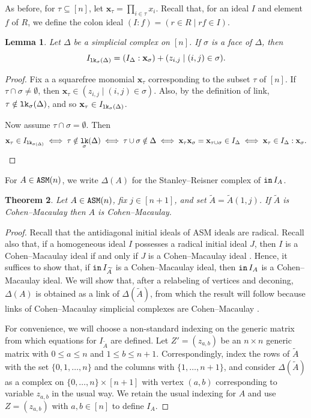 \documentclass[12 pt]{amsart}
\DeclareMathOperator{\init}{{\tt in}}
\DeclareMathOperator{\lk}{{\tt lk}}
\DeclareMathOperator{\asm}{\tt ASM}
\theoremstyle{plain}
\newtheorem{thm}{Theorem}[section]
\newtheorem{lemma}[thm]{Lemma}
\theoremstyle{definition}
\theoremstyle{remark}
\begin{document}
{As before, for $\tau \subseteq [n]$, let $\mathbf{x}_\tau = \prod_{i \in \tau} x_i$.  Recall that, for an ideal $I$ and element $f$ of $R$, we define the colon ideal $(I:f) = (r \in R \mid rf \in I)$.

\begin{lemma}\label{lem:link-colon}
   Let $\Delta$ be a simplicial complex on $[n]$. If $\sigma$ is a face of $\Delta$, then \[
   I_{\lk_\sigma(\Delta)} = (I_{\Delta}: \mathbf{x}_\sigma)+(z_{i,j} \mid (i,j) \in \sigma).
   \]
\end{lemma}
\begin{proof}
    Fix a a squarefree monomial $\mathbf{x}_\tau$ corresponding to the subset $\tau$ of $[n]$.  If $\tau \cap \sigma \neq \emptyset$, then $\mathbf{x}_\tau \in (z_{i,j} \mid (i,j) \in \sigma)$.  Also, by the definition of link, $\tau \notin \lk_\sigma(\Delta)$, and so $\mathbf{x}_\tau \in I_{\lk_\sigma(\Delta)}$.  

    Now assume $\tau \cap \sigma = \emptyset$.  Then \[
\mathbf{x}_\tau \in I_{\lk_{\sigma(\Delta)}} \iff \tau \notin \lk_\sigma(\Delta) \iff \tau \cup \sigma \notin \Delta \iff \mathbf{x}_\tau \mathbf{x}_\sigma= \mathbf{x}_{\tau \cup \sigma} \in I_\Delta \iff \mathbf{x}_\tau \in I_\Delta:\mathbf{x}_\sigma. \qedhere
    \]
\end{proof}

For $A \in \asm(n)$, we write $\Delta(A)$ for the Stanley--Reisner complex of $\init I_A$.


\begin{thm}\label{topPermRow}
Let $A \in \asm(n)$, fix $j \in [n+1]$, and set $\widetilde{A} = \widetilde{A}(1,j)$.
If $\widetilde{A}$ is Cohen--Macaulay then $A$ is Cohen--Macaulay.
\end{thm}
\begin{proof}
    Recall that the antidiagonal initial ideals of ASM ideals are radical. Recall also that, if a homogeneous ideal $I$ possesses a radical initial ideal $J$, then $I$ is a Cohen--Macaulay ideal if and only if $J$ is a Cohen--Macaulay ideal \cite{CV20}.  Hence, it suffices to show that, if $\init I_{\widetilde{A}}$ is a Cohen--Macaulay ideal, then $\init I_A$ is a Cohen--Macaulay ideal.  We will show that, after a relabeling of vertices and deconing, $\Delta(A)$ is obtained as a link of $\Delta(\widetilde{A})$, from which the result will follow because links of Cohen--Macaulay simplicial complexes are Cohen--Macaulay \cite{Rei76}.

    For convenience, we will choose a non-standard indexing on the generic matrix from which equations for $I_{\widetilde{A}}$ are defined.  Let $Z' = (z_{a,b})$ be an $n \times n$ generic matrix with $0 \leq a \leq n$ and $1 \leq b \leq n+1$.  Correspondingly, index the rows of $\widetilde{A}$ with the set $\{0,1,\ldots, n\}$ and the columns with $\{1,\ldots,n+1\}$, and consider $\Delta(\widetilde{A})$ as a complex on $\{0,\ldots,n\} \times [n+1]$ with vertex $(a,b)$ corresponding to variable $z_{a,b}$ in the usual way.  We retain the usual indexing for $A$ and use $Z = (z_{a,b})$ with $a,b \in [n]$ to define $I_A$.


\end{proof}}
\end{document}
